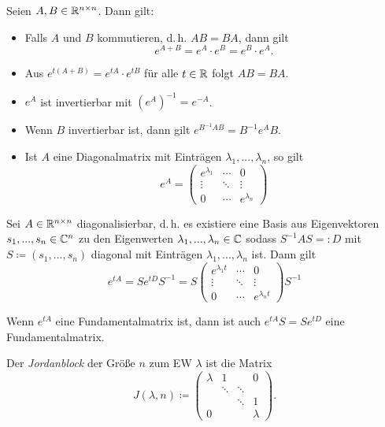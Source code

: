 \documentclass{cheat-sheet}
\begin{document}
\begin{satz}
  Seien $A, B \in \mathbb{R}^{n \times n}$. Dann gilt:
  \begin{itemize}
    \item Falls $A$ und $B$ kommutieren, d.\,h. $AB = BA$, dann gilt
    \[ e^{A+B} = e^A \cdot e^B = e^B \cdot e^A. \]
    \item Aus $e^{t(A + B)} = e^{tA} \cdot e^{tB}$ für alle $t \in \mathbb{R}$ folgt $AB = BA$.
    \item $e^{A}$ ist invertierbar mit $(e^A)^{-1} = e^{-A}$.
    \item Wenn $B$ invertierbar ist, dann gilt $e^{B^{-1}AB} = B^{-1} e^A B$.
    \item Ist $A$ eine Diagonalmatrix mit Einträgen $\lambda_1, ..., \lambda_n$, so gilt
    \[ e^A = \begin{pmatrix} e^{\lambda_1} & \cdots & 0 \\ \vdots & \ddots & \vdots \\ 0 & \cdots & e^{\lambda_n} \end{pmatrix} \]
  \end{itemize}
\end{satz}

\begin{satz}
  Sei $A \in \mathbb{R}^{n \times n}$ diagonalisierbar, d.\,h. es existiere eine Basis aus Eigenvektoren $s_1, ..., s_n \in \mathbb{C}^n$ zu den Eigenwerten $\lambda_1, ..., \lambda_n \in \mathbb{C}$ sodass $S^{-1} A S =: D$ mit $S \coloneqq (s_1, ..., s_n)$ diagonal mit Einträgen $\lambda_1, ..., \lambda_n$ ist. Dann gilt
  \[ e^{tA} = S e^{tD} S^{-1} = S \begin{pmatrix} e^{\lambda_1 t} & \cdots & 0 \\ \vdots & \ddots & \vdots \\ 0 & \cdots & e^{\lambda_n t} \end{pmatrix} S^{-1} \]
\end{satz}

\begin{bem}
  Wenn $e^{tA}$ eine Fundamentalmatrix ist, dann ist auch $e^{tA} S = S e^{tD}$ eine Fundamentalmatrix.
\end{bem}



\begin{defn}
  Der \emph{Jordanblock} der Größe $n$ zum EW $\lambda$ ist die Matrix
  \[ J(\lambda, n) \coloneqq \begin{pmatrix}
    \lambda & 1 & & 0 \\
    & \ddots & \ddots & \\
    & & \ddots & 1 \\
    0 & & & \lambda
  \end{pmatrix}. \]
\end{defn}
\end{document}
